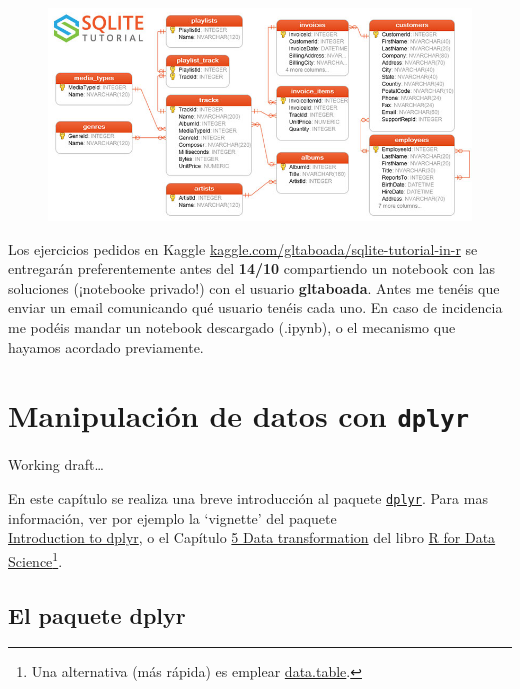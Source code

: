 \documentclass[]{book}
\begin{document}
\begin{figure}
\centering
\includegraphics[width=6.25000in]{images/sqlite-sample-database-color.jpg}
\caption{}
\end{figure}

Los ejercicios pedidos en Kaggle
\href{https://www.kaggle.com/gltaboada/sqlite-tutorial-in-r}{kaggle.com/gltaboada/sqlite-tutorial-in-r}
se entregarán preferentemente antes del \textbf{14/10} compartiendo un
notebook con las soluciones (¡notebooke privado!) con el usuario
\textbf{gltaboada}. Antes me tenéis que enviar un email comunicando qué
usuario tenéis cada uno. En caso de incidencia me podéis mandar un
notebook descargado (.ipynb), o el mecanismo que hayamos acordado
previamente.

\chapter{\texorpdfstring{Manipulación de datos con
\texttt{dplyr}}{Manipulación de datos con dplyr}}\label{dplyr}

Working draft\ldots{}

En este capítulo se realiza una breve introducción al paquete
\href{https://dplyr.tidyverse.org/index.html}{\texttt{dplyr}}. Para mas
información, ver por ejemplo la `vignette' del paquete\\
\href{https://cran.rstudio.com/web/packages/dplyr/vignettes/dplyr.html}{Introduction
to dplyr}, o el Capítulo \href{http://r4ds.had.co.nz/transform.html}{5
Data transformation} del libro \href{http://r4ds.had.co.nz}{R for Data
Science}\footnote{Una alternativa (más rápida) es emplear
  \href{https://rdatatable.gitlab.io/data.table}{data.table}.}.

\section{\texorpdfstring{El paquete
\textbf{dplyr}}{El paquete dplyr}}\label{el-paquete-dplyr}
\end{document}
